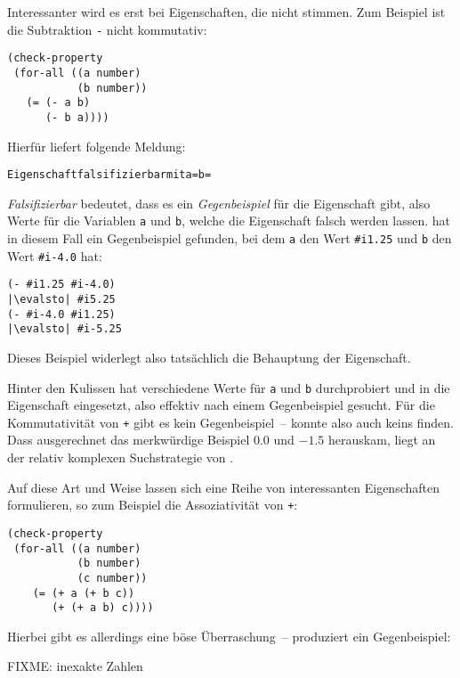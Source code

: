 Interessanter wird es erst bei Eigenschaften, die nicht stimmen.  Zum
Beispiel ist die Subtraktion \lstinline{-} nicht kommutativ:
%
\begin{lstlisting}
(check-property
 (for-all ((a number)
           (b number))
   (= (- a b)
      (- b a))))
\end{lstlisting}
%
Hierfür liefert \drscheme{} folgende Meldung:
%
\begin{alltt}
        Eigenschaft falsifizierbar mit a =  b = 
\end{alltt}
%
\textit{Falsifizierbar} bedeutet, dass es ein
\textit{Gegenbeispiel} für die Eigenschaft gibt,
also Werte für die Variablen \lstinline{a} und \lstinline{b}, welche die
Eigenschaft falsch werden lassen.  \drscheme{} hat in diesem Fall ein
Gegenbeispiel gefunden, bei dem \lstinline{a} den Wert \verb|#i1.25| und
\lstinline{b} den Wert \verb|#i-4.0| hat:
%
\begin{lstlisting}
(- #i1.25 #i-4.0)
|\evalsto| #i5.25
(- #i-4.0 #i1.25)
|\evalsto| #i-5.25
\end{lstlisting}
%
Dieses Beispiel widerlegt also tatsächlich die Behauptung der Eigenschaft.

Hinter den Kulissen hat \drscheme{} verschiedene Werte für \lstinline{a} und
\lstinline{b} durchprobiert und in die Eigenschaft eingesetzt, also effektiv
nach einem Gegenbeispiel gesucht.  Für die Kommutativität von
\lstinline{+} gibt es kein Gegenbeispiel~-- \drscheme{} konnte also auch
keins finden.  Dass ausgerechnet das merkwürdige Beispiel $0.0$ und
$-1.5$ herauskam, liegt an der relativ komplexen Suchstrategie von
\drscheme{}.

Auf diese Art und Weise lassen sich eine Reihe von interessanten
Eigenschaften formulieren, so zum Beispiel die Assoziativität von
\lstinline{+}:\label{sec:plus-not-associative}
%
\begin{lstlisting}
(check-property
 (for-all ((a number)
           (b number)
           (c number))
    (= (+ a (+ b c))
       (+ (+ a b) c))))
\end{lstlisting}
%
Hierbei gibt es allerdings eine böse Überraschung~-- \drscheme{} produziert
ein Gegenbeispiel:

FIXME: inexakte Zahlen

